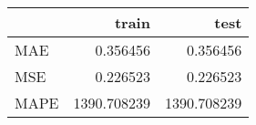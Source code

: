 \begin{tabular}{lrr}
\toprule
{} &        train &         test \\
\midrule
MAE  &     0.356456 &     0.356456 \\
MSE  &     0.226523 &     0.226523 \\
MAPE &  1390.708239 &  1390.708239 \\
\bottomrule
\end{tabular}
